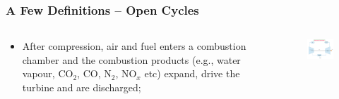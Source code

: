 \documentclass[10pt,compress]{beamer}
\begin{document}
\begin{frame}
 \frametitle{A Few Definitions -- Open Cycles}
 \begin{columns}
  \begin{column}[c]{0.4\linewidth}
   \begin{itemize}
    \item After compression, air and fuel enters a combustion chamber and the combustion products (e.g., water vapour, CO$_{2}$, CO, N$_{2}$, NO$_{x}$ etc) expand, drive the turbine and are discharged;
   \end{itemize}
  \end{column}
  \begin{column}[c]{0.6\linewidth}
   \begin{figure}%
    \begin{center}
     \includegraphics[width=7.5cm,clip]{./Pics/Open_Gas_Turbine_Engines}
    \end{center}
   \end{figure}  
  \end{column}  
 \end{columns}
 \normalsize

\end{frame}
\end{document}
